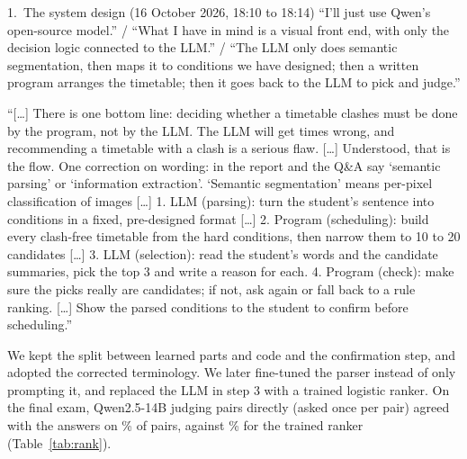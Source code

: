\begin{exchange}{1.\ The system design (16 October 2026, 18:10 to 18:14)}
 ``I'll just use Qwen's open-source model.'' / ``What I have in mind is a visual front end, with only the decision logic connected to the LLM.'' / ``The LLM only does semantic segmentation, then maps it to conditions we have designed; then a written program arranges the timetable; then it goes back to the LLM to pick and judge.''

 ``[\ldots] There is one bottom line: deciding whether a timetable clashes must be done by the program, not by the LLM. The LLM will get times wrong, and recommending a timetable with a clash is a serious flaw. [\ldots] Understood, that is the flow. One correction on wording: in the report and the Q\&A say `semantic parsing' or `information extraction'. `Semantic segmentation' means per-pixel classification of images [\ldots] 1. LLM (parsing): turn the student's sentence into conditions in a fixed, pre-designed format [\ldots] 2. Program (scheduling): build every clash-free timetable from the hard conditions, then narrow them to 10 to 20 candidates [\ldots] 3. LLM (selection): read the student's words and the candidate summaries, pick the top 3 and write a reason for each. 4. Program (check): make sure the picks really are candidates; if not, ask again or fall back to a rule ranking. [\ldots] Show the parsed conditions to the student to confirm before scheduling.''

 We kept the split between learned parts and code and the confirmation step, and adopted the corrected terminology. We later fine-tuned the parser instead of only prompting it, and replaced the LLM in step 3 with a trained logistic ranker.
 On the final exam, Qwen2.5-14B judging pairs directly (asked once per pair) agreed with the answers on \rQwen\% of pairs, against \rLR\% for the trained ranker (Table~\ref{tab:rank}).
\end{exchange}

